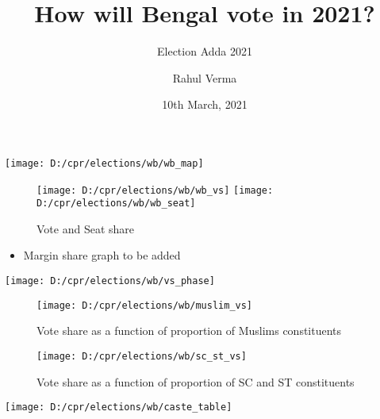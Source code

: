 \documentclass[
  ignorenonframetext,
]{beamer}
\title{How will Bengal vote in 2021?}
\subtitle{Election Adda 2021}
\author{Rahul Verma}
\date{10th March, 2021}
\institute{Centre for Policy Research}
\providecommand{\tightlist}{%
  \setlength{\itemsep}{0pt}\setlength{\parskip}{0pt}}
\begin{document}
\frame{\titlepage}

\begin{frame}
\begin{center}\texttt{[image: D:/cpr/elections/wb/wb\_map]} \end{center}
\end{frame}

\begin{frame}
\begin{figure}
\texttt{[image: D:/cpr/elections/wb/wb\_vs]} \texttt{[image: D:/cpr/elections/wb/wb\_seat]} \caption{Vote and Seat share}\label{fig:figures-side}
\end{figure}
\end{frame}

\begin{frame}
\begin{itemize}
\tightlist
\item
  Margin share graph to be added
\end{itemize}
\end{frame}

\begin{frame}
\begin{center}\texttt{[image: D:/cpr/elections/wb/vs\_phase]} \end{center}
\end{frame}

\begin{frame}
\begin{figure}

{\centering \texttt{[image: D:/cpr/elections/wb/muslim\_vs]} 

}

\caption{Vote share as a function of  proportion of Muslims constituents}\label{fig:unnamed-chunk-3}
\end{figure}
\end{frame}

\begin{frame}
\begin{figure}

{\centering \texttt{[image: D:/cpr/elections/wb/sc\_st\_vs]} 

}

\caption{Vote share as a function of  proportion of SC and ST constituents}\label{fig:unnamed-chunk-4}
\end{figure}
\end{frame}

\begin{frame}
\begin{center}\texttt{[image: D:/cpr/elections/wb/caste\_table]} \end{center}
\end{frame}
\end{document}
